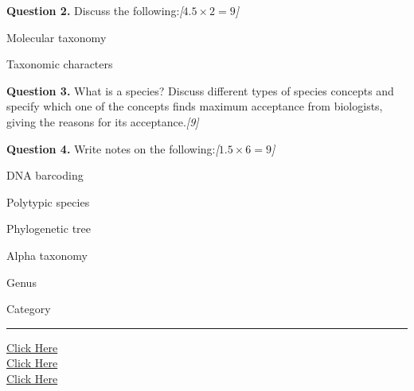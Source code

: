 \documentclass[11pt,a4paper]{article}
\newcommand{\pts}[1]{\hfill   \textit{[#1]}}
\begin{document}
\medskip


\noindent   \textbf{Question 2.} Discuss the following:\pts{$4.5  \times 2 = 9$}

\begin{parts}
  \item Molecular taxonomy
  \item Taxonomic characters
\end{parts}

\medskip


\noindent   \textbf{Question 3.} What is a species? Discuss different types of species concepts and specify which one of the concepts finds maximum acceptance from biologists, giving the reasons for its acceptance.\pts{9}

\medskip


\noindent   \textbf{Question 4.} Write notes on the following:\pts{$1.5  \times 6 = 9$}

\begin{parts}
  \item DNA barcoding
  \item Polytypic species
  \item Phylogenetic tree
  
  
\begin{center}
  
  \end{center}

  \item Alpha taxonomy
  \item Genus
  \item Category
\end{parts}

\vfill
\rule{\linewidth}{0.4pt}

\begin{center}\small
\href{https://bhu-exam.vercel.app/}{Click Here}\\[4pt]\href{https://me-aryan.vercel.app/}{Click Here}\\[4pt]\href{https://quashan-me.vercel.app/}{Click Here}
\end{center}
\end{document}
